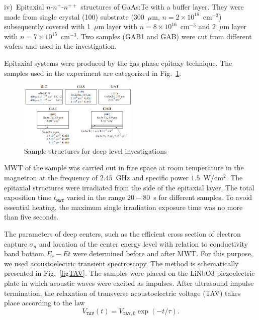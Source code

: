 \documentclass[%
 aip,jap,
 amsmath,amssymb,
 reprint,%
]{revtex4-1}
\begin{document}
\noindent
iv)~Epitaxial $n$-$n^+$-$n^{++}$ structures of GaAs:Te with a buffer layer.
 They were made from single crystal (100) substrate (300~$\mu$m, $n= 2\times10^{18}$~cm$^{-3}$)
  subsequently covered with 1~$\mu$m layer with $n=8\times10^{16}$~cm$^{-3}$ and
  2~$\mu$m layer with $n=7\times10^{15}$~cm$^{-3}$.
  Two samples (GAB1 and GAB) were cut from different wafers and used in the investigation.

Epitaxial systems were produced by the gas phase epitaxy technique.
The samples used in the experiment are categorized in Fig.~\ref{figSamp_TAV}.

\begin{figure}
\includegraphics[width=0.5\textwidth]{Fig1}
\caption{\label{figSamp_TAV}
Sample structures for deep level investigations
}%
\end{figure}

MWT of the sample was carried out in free space at room temperature in the magnetron at the frequency of  $2.45$~GHz
and specific power $1.5$~W/cm$^{2}$.
The epitaxial structures were irradiated from the side of the epitaxial layer.
The total exposition time $t_\mathtt{MWT}$ varied in the range $20-80$~s for different samples.
To avoid essential heating, the maximum single irradiation exposure time was no more than  five seconds.


The parameters of deep centers, such as the efficient cross section of electron capture $\sigma_n$
and location of the center energy level with relation to conductivity band bottom $E_c-Et$ were determined before and after MWT.
For this purpose, we used acoustoelectric transient spectroscopy. \cite{OstrovPAN,OlikhSSC,PANnewEn,OstrovskiiSST}
The method is schematically presented in Fig.~\ref{figTAV}.
The samples were placed on the LiNbO3 piezoelectric plate in which acoustic waves were excited as impulses.
After ultrasound impulse termination, the relaxation of transverse acoustoelectric voltage (TAV) takes place according to the law
\begin{equation}\label{eqVtav}
  V_\mathtt{TAV}(t)=V_{\mathtt{TAV},0}\exp(-t/\tau).
\end{equation}
\end{document}
